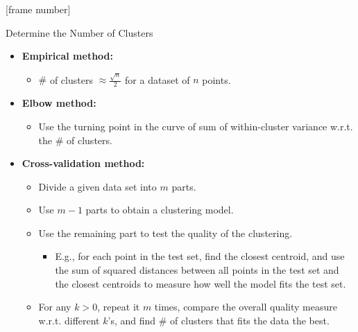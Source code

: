 \documentclass[aspectratio=169,t,xcolor=dvipsnames]{beamer}
\begin{document}
  {
    [frame number]
    \begin{frame}{Determine the Number of Clusters}
      \begin{itemize}
        \item \textbf{Empirical method:}
        \begin{itemize}
          \item $\#$ of clusters $\approx \frac{\sqrt{n}}{2}$ for a dataset of $n$ points.
        \end{itemize}
        \item \textbf{Elbow method:}
        \begin{itemize}
          \item Use the turning point in the curve of sum of within-cluster variance w.r.t. the $\#$ of clusters.
        \end{itemize}
        \item \textbf{Cross-validation method:}
        \begin{itemize}
          \item Divide a given data set into $m$ parts.
          \item Use $m-1$ parts to obtain a clustering model.
          \item Use the remaining part to test the quality of the clustering.
          \begin{itemize}
            \item E.g., for each point in the test set, find the closest centroid, and use the sum of squared distances between all points in the test set and the closest centroids to measure how well the model fits the test set.
          \end{itemize}
          \item For any $k > 0$, repeat it $m$ times, compare the overall quality measure w.r.t. different $k$'s, and find $\#$ of clusters that fits the data the best.
        \end{itemize}
      \end{itemize}
    \end{frame}
  }
\end{document}
